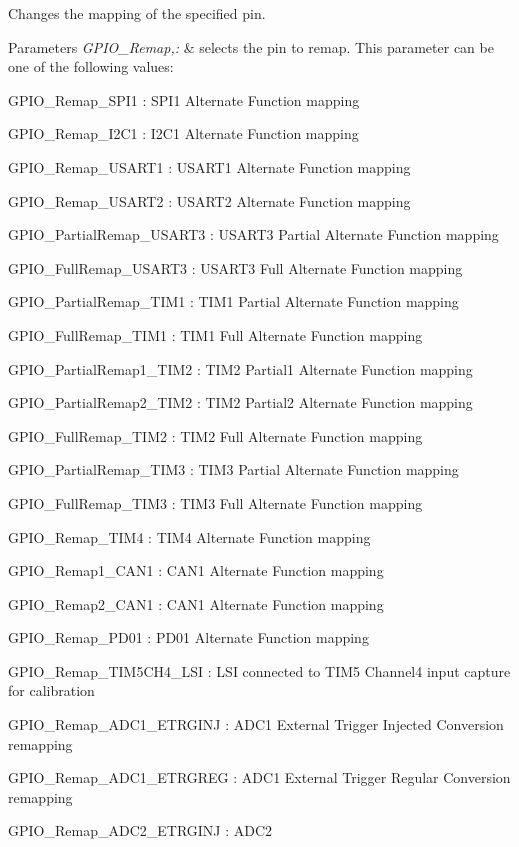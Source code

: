 Changes the mapping of the specified pin. 


\begin{DoxyParams}{Parameters}
{\em G\-P\-I\-O\-\_\-\-Remap,\-:} & selects the pin to remap. This parameter can be one of the following values\-: \begin{DoxyItemize}
\item G\-P\-I\-O\-\_\-\-Remap\-\_\-\-S\-P\-I1 \-: S\-P\-I1 Alternate Function mapping \item G\-P\-I\-O\-\_\-\-Remap\-\_\-\-I2\-C1 \-: I2\-C1 Alternate Function mapping \item G\-P\-I\-O\-\_\-\-Remap\-\_\-\-U\-S\-A\-R\-T1 \-: U\-S\-A\-R\-T1 Alternate Function mapping \item G\-P\-I\-O\-\_\-\-Remap\-\_\-\-U\-S\-A\-R\-T2 \-: U\-S\-A\-R\-T2 Alternate Function mapping \item G\-P\-I\-O\-\_\-\-Partial\-Remap\-\_\-\-U\-S\-A\-R\-T3 \-: U\-S\-A\-R\-T3 Partial Alternate Function mapping \item G\-P\-I\-O\-\_\-\-Full\-Remap\-\_\-\-U\-S\-A\-R\-T3 \-: U\-S\-A\-R\-T3 Full Alternate Function mapping \item G\-P\-I\-O\-\_\-\-Partial\-Remap\-\_\-\-T\-I\-M1 \-: T\-I\-M1 Partial Alternate Function mapping \item G\-P\-I\-O\-\_\-\-Full\-Remap\-\_\-\-T\-I\-M1 \-: T\-I\-M1 Full Alternate Function mapping \item G\-P\-I\-O\-\_\-\-Partial\-Remap1\-\_\-\-T\-I\-M2 \-: T\-I\-M2 Partial1 Alternate Function mapping \item G\-P\-I\-O\-\_\-\-Partial\-Remap2\-\_\-\-T\-I\-M2 \-: T\-I\-M2 Partial2 Alternate Function mapping \item G\-P\-I\-O\-\_\-\-Full\-Remap\-\_\-\-T\-I\-M2 \-: T\-I\-M2 Full Alternate Function mapping \item G\-P\-I\-O\-\_\-\-Partial\-Remap\-\_\-\-T\-I\-M3 \-: T\-I\-M3 Partial Alternate Function mapping \item G\-P\-I\-O\-\_\-\-Full\-Remap\-\_\-\-T\-I\-M3 \-: T\-I\-M3 Full Alternate Function mapping \item G\-P\-I\-O\-\_\-\-Remap\-\_\-\-T\-I\-M4 \-: T\-I\-M4 Alternate Function mapping \item G\-P\-I\-O\-\_\-\-Remap1\-\_\-\-C\-A\-N1 \-: C\-A\-N1 Alternate Function mapping \item G\-P\-I\-O\-\_\-\-Remap2\-\_\-\-C\-A\-N1 \-: C\-A\-N1 Alternate Function mapping \item G\-P\-I\-O\-\_\-\-Remap\-\_\-\-P\-D01 \-: P\-D01 Alternate Function mapping \item G\-P\-I\-O\-\_\-\-Remap\-\_\-\-T\-I\-M5\-C\-H4\-\_\-\-L\-S\-I \-: L\-S\-I connected to T\-I\-M5 Channel4 input capture for calibration \item G\-P\-I\-O\-\_\-\-Remap\-\_\-\-A\-D\-C1\-\_\-\-E\-T\-R\-G\-I\-N\-J \-: A\-D\-C1 External Trigger Injected Conversion remapping \item G\-P\-I\-O\-\_\-\-Remap\-\_\-\-A\-D\-C1\-\_\-\-E\-T\-R\-G\-R\-E\-G \-: A\-D\-C1 External Trigger Regular Conversion remapping \item G\-P\-I\-O\-\_\-\-Remap\-\_\-\-A\-D\-C2\-\_\-\-E\-T\-R\-G\-I\-N\-J \-: A\-D\-C2 
\end{DoxyItemize}
\end{DoxyParams}
